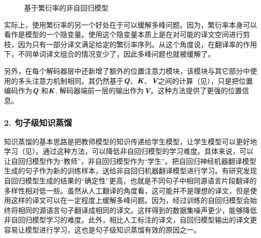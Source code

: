 \begin{figure}[htp]
\centering
 
\caption{基于繁衍率的非自回归模型}
\label{fig:14-14}
\end{figure}

\parinterval 实际上，使用繁衍率的另一个好处在于可以缓解多峰问题。因为，繁衍率本身可以看作是模型的一个隐变量。使用这个隐变量本质上是在对可能的译文空间进行剪枝，因为只有一部分译文满足给定的繁衍率序列。从这个角度说，在翻译率的作用下，不同单词译文组合的情况变少了，因此多峰问题也就被缓解了。

\parinterval 另外，在每个解码器层中还新增了额外的位置注意力模块，该模块与其它部分中使用的多头注意力机制相同。其仍然基于$\textbf{\em Q}$、$\textbf{\em K}$、$\textbf{\em V}$之间的计算（见{\chaptertwelve}），只是把位置编码作为$\textbf{\em Q}$ 和$\textbf{\em K}$, 解码器端前一层的输出作为$\textbf{\em V}$。这种方法提供了更强的位置信息。


\subsubsection{2. 句子级知识蒸馏}

\parinterval 知识蒸馏的基本思路是把教师模型的知识传递给学生模型，让学生模型可以更好地学习（见\chapterthirteen）。通过这种方法，可以降低非自回归模型的学习难度。具体来说，可以让自回归模型作为“教师”，非自回归模型作为“学生”。把自回归神经机器翻译模型生成的句子作为新的训练样本，送给非自回归机器翻译模型进行学习。有研究发现自回归模型生成的结果的“确定性”更高，也就是不同句子中相同源语言片段翻译的多样性相对低一些。虽然从人工翻译的角度看，这可能并不是理想的译文，但是使用这样的译文可以在一定程度上缓解多峰问题。因为，经过训练的自回归模型会始终将相同的源语言句子翻译成相同的译文。这样得到的数据集噪声更少，能够降低非自回归模型学习的难度。此外，相比人工标注的译文，自回归模型输出的译文更容易让模型进行学习，这也是句子级知识蒸馏有效的原因之一。


